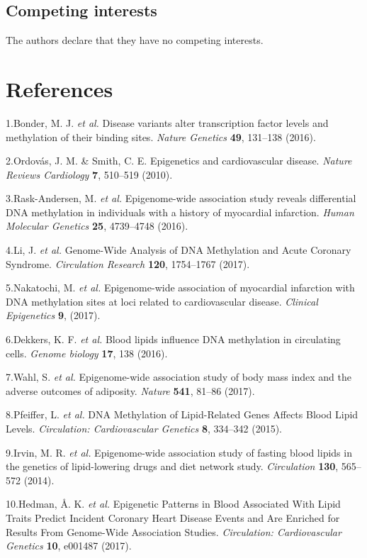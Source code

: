 \documentclass[]{article}
\theoremstyle{definition}
\theoremstyle{definition}
\theoremstyle{definition}
\theoremstyle{remark}
\begin{document}
\subsection{Competing interests}\label{competing-interests}

The authors declare that they have no competing interests.

\section{References}\label{references}


1.Bonder, M. J. \emph{et al.} Disease variants alter transcription
factor levels and methylation of their binding sites. \emph{Nature
Genetics} \textbf{49}, 131--138 (2016).

2.Ordov{á}s, J. M. \& Smith, C. E. Epigenetics and cardiovascular
disease. \emph{Nature Reviews Cardiology} \textbf{7}, 510--519 (2010).

3.Rask-Andersen, M. \emph{et al.} Epigenome-wide association study
reveals differential DNA methylation in individuals with a history of
myocardial infarction. \emph{Human Molecular Genetics} \textbf{25},
4739--4748 (2016).

4.Li, J. \emph{et al.} Genome-Wide Analysis of DNA Methylation and Acute
Coronary Syndrome. \emph{Circulation Research} \textbf{120}, 1754--1767
(2017).

5.Nakatochi, M. \emph{et al.} Epigenome-wide association of myocardial
infarction with DNA methylation sites at loci related to cardiovascular
disease. \emph{Clinical Epigenetics} \textbf{9}, (2017).

6.Dekkers, K. F. \emph{et al.} Blood lipids influence DNA methylation in
circulating cells. \emph{Genome biology} \textbf{17}, 138 (2016).

7.Wahl, S. \emph{et al.} Epigenome-wide association study of body mass
index and the adverse outcomes of adiposity. \emph{Nature} \textbf{541},
81--86 (2017).

8.Pfeiffer, L. \emph{et al.} DNA Methylation of Lipid-Related Genes
Affects Blood Lipid Levels. \emph{Circulation: Cardiovascular Genetics}
\textbf{8}, 334--342 (2015).

9.Irvin, M. R. \emph{et al.} Epigenome-wide association study of fasting
blood lipids in the genetics of lipid-lowering drugs and diet network
study. \emph{Circulation} \textbf{130}, 565--572 (2014).

10.Hedman, Å. K. \emph{et al.} Epigenetic Patterns in Blood Associated
With Lipid Traits Predict Incident Coronary Heart Disease Events and Are
Enriched for Results From Genome-Wide Association Studies.
\emph{Circulation: Cardiovascular Genetics} \textbf{10}, e001487 (2017).
\end{document}
